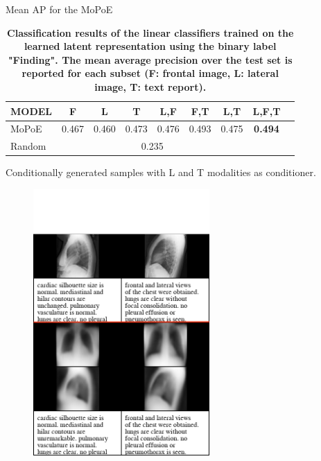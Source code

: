 \documentclass[aspectratio=169]{beamer}
\begin{document}
    \begin{frame}{Mean AP for the MoPoE}
        \begin{table}
            \centering
            \begin{tabular}{lcccccccc}
                MODEL & F     & L     & T     & L,F   & F,T   & L,T   & L,F,T          \\
                \hline
                MoPoE & 0.467 & 0.460 & 0.473 & 0.476 & 0.493 & 0.475 & \textbf{0.494} \\
                Random & \multicolumn{6}{c}{0.235}
            \end{tabular}
            \caption{\textbf{Classification results of the linear classifiers trained on the learned latent representation using the binary label "Finding". The mean average precision over the test set
            is reported for each subset (F: frontal image, L: lateral image, T: text report).}}
        \end{table}
    \end{frame}


    \begin{frame}{Conditionally generated samples with L and T modalities as conditioner.}

        \begin{figure}
            \vspace{-0.1\textheight}
            \includegraphics[width=0.6\textwidth, height = 0.75\textheight, keepaspectratio]{data/cond_gen/Lateral_text_small_edited.png}

        \end{figure}
    \end{frame}
\end{document}
